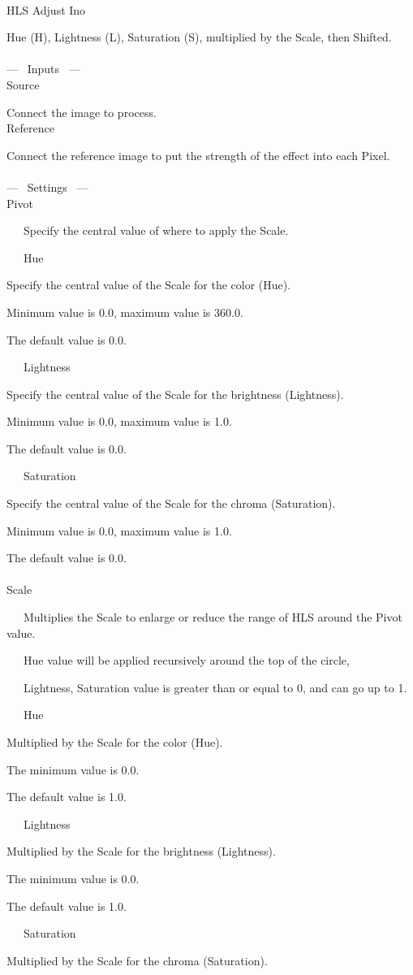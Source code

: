\documentclass[a4paper,12pt]{article}
\begin{document}
\thispagestyle{empty}

\Large
\noindent \\
HLS Adjust Ino\medskip
\par
\normalsize
Hue (H), Lightness (L), Saturation (S), multiplied by the Scale, then Shifted.\\
\\
--- \ Inputs \ ---\\
Source\par
Connect the image to process.\\
Reference\par
Connect the reference image to put the strength of the effect into each Pixel.\\
\\
--- \ Settings \ ---\\
Pivot\par
\noindent \ \ \, Specify the central value of where to apply the Scale.\\
\par
\noindent \ \ \, Hue\par
Specify the central value of the Scale for the color (Hue).\par
Minimum value is 0.0, maximum value is 360.0.\par
The default value is 0.0.\par
\noindent \ \ \, Lightness\par
Specify the central value of the Scale for the brightness (Lightness).\par
Minimum value is 0.0, maximum value is 1.0.\par
The default value is 0.0.\par
\noindent \ \ \, Saturation\par
Specify the central value of the Scale for the chroma (Saturation).\par
Minimum value is 0.0, maximum value is 1.0.\par
The default value is 0.0.\\
\\
Scale\par
\noindent \ \ \, Multiplies the Scale to enlarge or reduce the range of HLS around the Pivot value.\par
\noindent \ \ \, Hue value will be applied recursively around the top of the circle,\par
\noindent \ \ \, Lightness, Saturation value is greater than or equal to 0, and can go up to 1.\\
\par
\noindent \ \ \, Hue\par
Multiplied by the Scale for the color (Hue).\par
The minimum value is 0.0.\par
The default value is 1.0.\par
\noindent \ \ \, Lightness\par
Multiplied by the Scale for the brightness (Lightness).\par
The minimum value is 0.0.\par
The default value is 1.0.\par
\noindent \ \ \, Saturation\par
Multiplied by the Scale for the chroma (Saturation).
\end{document}
